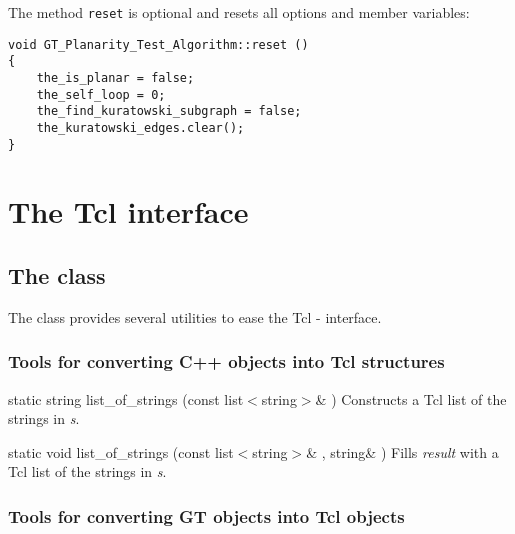 \documentclass[twoside,fleqn]{report}
\begin{document}
\noindent The method \texttt{reset} is optional and resets all options and
member variables:

\begin{verbatim}
void GT_Planarity_Test_Algorithm::reset ()
{
    the_is_planar = false;
    the_self_loop = 0;
    the_find_kuratowski_subgraph = false;
    the_kuratowski_edges.clear();
}
\end{verbatim}



%
%


\chapter{The Tcl interface}
\label{c:TclInterface}


%
%

\section{The class }
\label{s:GT_Tcl}


The class  provides several utilities to ease the Tcl
- \Graphlet{} interface.



\subsection{Tools for converting C++ objects into Tcl structures}

\begin{Cdefinition}

  \item[static string list\_of\_strings (const list$<$string$>$\& \Param{s})]
  Constructs a Tcl list of the strings in \emph{s}.

  \item[static void list\_of\_strings (const list$<$string$>$\& \Param{s},
  string\& \Param{result})]
  Fills \emph{result} with  a Tcl list of the strings in \emph{s}.

\end{Cdefinition}



\subsection{Tools for converting GT objects into Tcl objects}
\end{document}
